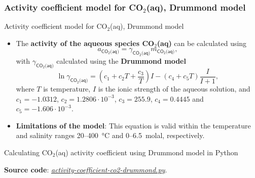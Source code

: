 \subsubsection{Activity coefficient model for CO$_2$(aq), Drummond model}
%
%
\begin{frame}{Activity coefficient model for CO$_{2}$(aq), Drummond model}
\begin{itemize}[<+->]
\item The \textbf{activity of the aqueous species CO$_{2}$(aq)} can be calculated
using
\[
a_{\mathsf{CO_{2}\text{(aq)}}}=\gamma_{\mathsf{CO_{2}\text{(aq)}}}m_{\mathsf{CO_{2}\text{(aq)}}},
\]
with $\gamma_{\mathsf{CO_{2}\text{(aq)}}}$ calculated using the \alert{\textbf{Drummond model}}
\[
\boxed{\ln\gamma_{\mathsf{CO_{2}\text{(aq)}}}=\left(c_{1}+c_{2}T+\frac{c_{3}}{T}\right)I-(c_{4}+c_{5}T)\frac{I}{I+1}},
\]
where $T$ is temperature,  
$I$ is the ionic strength of the aqueous solution, and 
${c_{1}=-1.0312}$, ${c_{2}=1.2806\cdot10^{-3}}$, ${c_{3}=255.9}$,
${c_{4}=0.4445}$ and ${c_{5}=-1.606\cdot10^{-3}}$. 
\item \textbf{Limitations of the model}: This equation is valid within the temperature and salinity ranges
20–400~°C and 0–6.5~molal, respectively.
\end{itemize}
\end{frame}
%
%
\begin{frame}{Calculating CO$_{2}$(aq) activity coefficient using Drummond model in Python}



\textbf{Source code}: \href{https://polybox.ethz.ch/index.php/s/Cg91f6PR1xIuKzY}{\textcolor{indigo(dye)}{\it  activity-coefficient-co2-drummond.py}}.

\end{frame}
